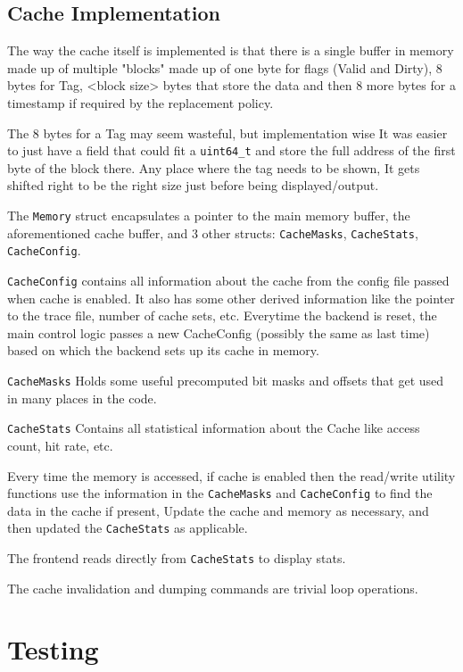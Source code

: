 \documentclass[12pt]{article}
\begin{document}
	\subsection{Cache Implementation}

	The way the cache itself is implemented is that there is a single buffer in memory made up of multiple "blocks" made up of one byte for flags (Valid and Dirty), 8 bytes for Tag, <block size> bytes that store the data and then 8 more bytes for a timestamp if required by the replacement policy.

	The 8 bytes for a Tag may seem wasteful, but implementation wise It was easier to just have a field that could fit a \verb|uint64_t| and store the full address of the first byte of the block there. Any place where the tag needs to be shown, It gets shifted right to be the right size just before being displayed/output.

	The \verb|Memory| struct encapsulates a pointer to the main memory buffer, the aforementioned cache buffer, and 3 other structs: \verb|CacheMasks|, \verb|CacheStats|, \verb|CacheConfig|.

	\verb|CacheConfig| contains all information about the cache from the config file passed when cache is enabled. It also has some other derived information like the pointer to the trace file, number of cache sets, etc. Everytime the backend is reset, the main control logic passes a new CacheConfig (possibly the same as last time) based on which the backend sets up its cache in memory.

	\verb|CacheMasks| Holds some useful precomputed bit masks and offsets that get used in many places in the code.

	\verb|CacheStats| Contains all statistical information about the Cache like access count, hit rate, etc.

	Every time the memory is accessed, if cache is enabled then the read/write utility functions use the information in the \verb|CacheMasks| and \verb|CacheConfig| to find the data in the cache if present, Update the cache and memory as necessary, and then updated the \verb|CacheStats| as applicable.

	The frontend reads directly from \verb|CacheStats| to display stats.

	The cache invalidation and dumping commands are trivial loop operations.

	\section{Testing}
\end{document}
